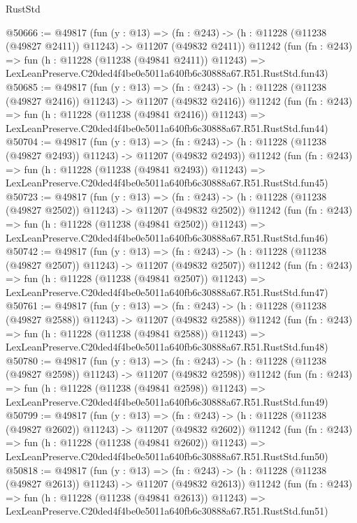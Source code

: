 \begin{lexlean}{RustStd}
\begin{coremodule}
@50666 := @49817
    (fun (y : @13) =>
    (fn : @243) -> (h : @11228 (@11238 (@49827 @2411)) @11243) -> @11207 (@49832 @2411))
    @11242
    (fun (fn : @243) =>
    fun (h : @11228 (@11238 (@49841 @2411)) @11243) =>
    LexLeanPreserve.C20ded4f4be0e5011a640fb6c30888a67.R51.RustStd.fun43)
@50685 := @49817
    (fun (y : @13) =>
    (fn : @243) -> (h : @11228 (@11238 (@49827 @2416)) @11243) -> @11207 (@49832 @2416))
    @11242
    (fun (fn : @243) =>
    fun (h : @11228 (@11238 (@49841 @2416)) @11243) =>
    LexLeanPreserve.C20ded4f4be0e5011a640fb6c30888a67.R51.RustStd.fun44)
@50704 := @49817
    (fun (y : @13) =>
    (fn : @243) -> (h : @11228 (@11238 (@49827 @2493)) @11243) -> @11207 (@49832 @2493))
    @11242
    (fun (fn : @243) =>
    fun (h : @11228 (@11238 (@49841 @2493)) @11243) =>
    LexLeanPreserve.C20ded4f4be0e5011a640fb6c30888a67.R51.RustStd.fun45)
@50723 := @49817
    (fun (y : @13) =>
    (fn : @243) -> (h : @11228 (@11238 (@49827 @2502)) @11243) -> @11207 (@49832 @2502))
    @11242
    (fun (fn : @243) =>
    fun (h : @11228 (@11238 (@49841 @2502)) @11243) =>
    LexLeanPreserve.C20ded4f4be0e5011a640fb6c30888a67.R51.RustStd.fun46)
@50742 := @49817
    (fun (y : @13) =>
    (fn : @243) -> (h : @11228 (@11238 (@49827 @2507)) @11243) -> @11207 (@49832 @2507))
    @11242
    (fun (fn : @243) =>
    fun (h : @11228 (@11238 (@49841 @2507)) @11243) =>
    LexLeanPreserve.C20ded4f4be0e5011a640fb6c30888a67.R51.RustStd.fun47)
@50761 := @49817
    (fun (y : @13) =>
    (fn : @243) -> (h : @11228 (@11238 (@49827 @2588)) @11243) -> @11207 (@49832 @2588))
    @11242
    (fun (fn : @243) =>
    fun (h : @11228 (@11238 (@49841 @2588)) @11243) =>
    LexLeanPreserve.C20ded4f4be0e5011a640fb6c30888a67.R51.RustStd.fun48)
@50780 := @49817
    (fun (y : @13) =>
    (fn : @243) -> (h : @11228 (@11238 (@49827 @2598)) @11243) -> @11207 (@49832 @2598))
    @11242
    (fun (fn : @243) =>
    fun (h : @11228 (@11238 (@49841 @2598)) @11243) =>
    LexLeanPreserve.C20ded4f4be0e5011a640fb6c30888a67.R51.RustStd.fun49)
@50799 := @49817
    (fun (y : @13) =>
    (fn : @243) -> (h : @11228 (@11238 (@49827 @2602)) @11243) -> @11207 (@49832 @2602))
    @11242
    (fun (fn : @243) =>
    fun (h : @11228 (@11238 (@49841 @2602)) @11243) =>
    LexLeanPreserve.C20ded4f4be0e5011a640fb6c30888a67.R51.RustStd.fun50)
@50818 := @49817
    (fun (y : @13) =>
    (fn : @243) -> (h : @11228 (@11238 (@49827 @2613)) @11243) -> @11207 (@49832 @2613))
    @11242
    (fun (fn : @243) =>
    fun (h : @11228 (@11238 (@49841 @2613)) @11243) =>
    LexLeanPreserve.C20ded4f4be0e5011a640fb6c30888a67.R51.RustStd.fun51)

\end{coremodule}
\end{lexlean}
